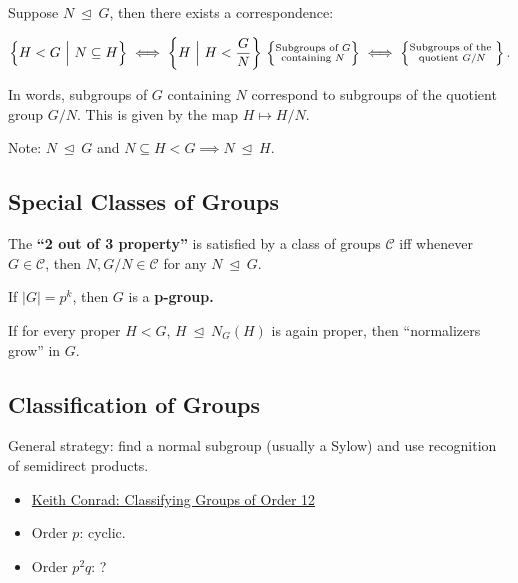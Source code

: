 Suppose \(N {~\trianglelefteq~}G\), then there exists a correspondence:

\[  
\left\{
H < G {~\mathrel{\Big|}~}N \subseteq H
\right\}
\iff
\left\{
H {~\mathrel{\Big|}~}H < \frac G N
\right\}
\\
\left\{{\substack{
  \text{Subgroups of $G$} \\
  \text{containing $N$}
}}\right\} \iff
\left\{{\substack{
  \text{Subgroups of the } \\
  \text{quotient $G/N$}
}}\right\}
.\]

In words, subgroups of \(G\) containing \(N\) correspond to subgroups of
the quotient group \(G/N\). This is given by the map \(H \mapsto H/N\).

Note: \(N {~\trianglelefteq~}G\) and
\(N \subseteq H < G \implies N {~\trianglelefteq~}H\).

\hypertarget{special-classes-of-groups}{%
\subsection{Special Classes of Groups}\label{special-classes-of-groups}}

The \textbf{``2 out of 3 property''} is satisfied by a class of groups
\(\mathcal{C}\) iff whenever \(G \in \mathcal{C}\), then
\(N, G/N \in \mathcal{C}\) for any \(N {~\trianglelefteq~}G\).

If \({\left\lvert {G} \right\rvert} = p^k\), then \(G\) is a
\textbf{p-group.}

If for every proper \(H<G\), \(H{~\trianglelefteq~}N_G(H)\) is again
proper, then ``normalizers grow'' in \(G\).

\hypertarget{classification-of-groups}{%
\subsection{Classification of Groups}\label{classification-of-groups}}

General strategy: find a normal subgroup (usually a Sylow) and use
recognition of semidirect products.

\begin{itemize}
\tightlist
\item
  \href{https://kconrad.math.uconn.edu/blurbs/grouptheory/group12.pdf}{Keith
  Conrad: Classifying Groups of Order 12}
\item
  Order \(p\): cyclic.
\item
  Order \(p^2q\): ?
\end{itemize}


